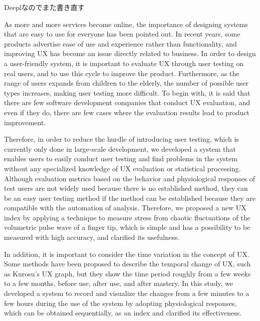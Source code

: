 \begin{eabstract}

Deeplなのでまた書き直す

As more and more services become online, the importance of designing systems that are easy to use for everyone has been pointed out. In recent years, some products advertise ease of use and experience rather than functionality, and improving UX has become an issue directly related to business. In order to design a user-friendly system, it is important to evaluate UX through user testing on real users, and to use this cycle to improve the product. Furthermore, as the range of users expands from children to the elderly, the number of possible user types increases, making user testing more difficult. To begin with, it is said that there are few software development companies that conduct UX evaluation, and even if they do, there are few cases where the evaluation results lead to product improvement.

Therefore, in order to reduce the hurdle of introducing user testing, which is currently only done in large-scale development, we developed a system that enables users to easily conduct user testing and find problems in the system without any specialized knowledge of UX evaluation or statistical processing. Although evaluation metrics based on the behavior and physiological responses of test users are not widely used because there is no established method, they can be an easy user testing method if the method can be established because they are compatible with the automation of analysis. Therefore, we proposed a new UX index by applying a technique to measure stress from chaotic fluctuations of the volumetric pulse wave of a finger tip, which is simple and has a possibility to be measured with high accuracy, and clarified its usefulness.

In addition, it is important to consider the time variation in the concept of UX. Some methods have been proposed to describe the temporal change of UX, such as Kurosu's UX graph, but they show the time period roughly from a few weeks to a few months, before use, after use, and after mastery. In this study, we developed a system to record and visualize the changes from a few minutes to a few hours during the use of the system by adopting physiological responses, which can be obtained sequentially, as an index and clarified its effectiveness.

\end{eabstract}
